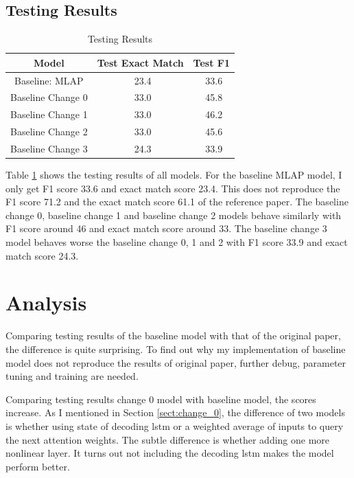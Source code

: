 \documentclass[modernstyle,12pt]{sjsuthesis}
\theoremstyle{definition}
\begin{document}
\subsection{Testing Results}

\begin{table}[htbp]\centering
  \caption{Testing Results}
  \label{tab:test_results}
  \begin{tabular}{|c|c|c|}
    \hline
    Model& Test Exact Match & Test F1 \\
    \hline\hline
    Baseline: MLAP & \ 23.4 &\ 33.6 \\
    Baseline Change 0& \ 33.0 &\ 45.8 \\
    Baseline Change 1 & \ 33.0 &\ 46.2 \\
    Baseline Change 2 & \ 33.0 &\ 45.6 \\
    Baseline Change 3 & \ 24.3 &\ 33.9 \\
    \hline
  \end{tabular}
\end{table}

Table \ref{tab:test_results} shows the testing results of all models. For the baseline MLAP model, I only get F1 score 33.6 and exact match score 23.4. This does not reproduce the F1 score 71.2 and the exact match score 61.1 of the reference paper\cite{wang2016machine}. The baseline change 0, baseline change 1 and baseline change 2 models behave similarly with F1 score around 46 and exact match score around 33. The baseline change 3 model behaves worse the baseline change 0, 1 and 2 with F1 score 33.9 and exact match score 24.3.




\section{Analysis}

Comparing testing results of the baseline model with that of the original paper, the difference is quite surprising. To find out why my implementation of baseline model does not reproduce the results of original paper, further debug, parameter tuning and training are needed.

Comparing testing results change 0 model with baseline model, the scores increase. As I mentioned in Section \ref{sect:change_0}, the difference of two models is whether using state of decoding lstm or a weighted average of inputs to query the next attention weights. The subtle difference is whether adding one more nonlinear layer. It turns out not including the decoding lstm makes the model perform better.
\end{document}
